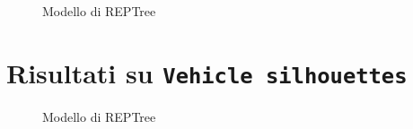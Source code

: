 \begin{figure}[htb]
	\caption{Modello di REPTree}
\end{figure}

\begin{mdframed}[frametitle=Esecuzione JRip]
	\scriptsize
\end{mdframed}

\begin{adjustwidth}{-8em}{}
	\scriptsize{}
\end{adjustwidth}

\pagebreak

\section{Risultati su \texttt{Vehicle silhouettes}}

\begin{mdframed}[frametitle=Esecuzione REPTree]
	\scriptsize
\end{mdframed}

\begin{figure}[htb]
	\caption{Modello di REPTree}
\end{figure}

